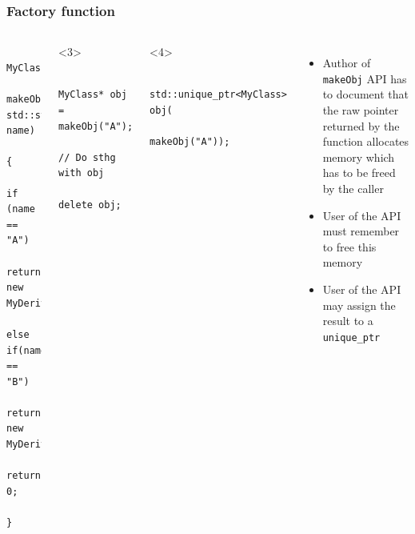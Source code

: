 \documentclass{beamer}
\begin{document}
\begin{frame}[fragile,t]
\frametitle{Factory function}
	\begin{columns}[t]
		\begin{lstlisting}
			MyClass* 
			makeObj(const std::string& name)
			{
				if (name == "A")
					return new MyDerivedClassA();
				else if(name == "B")
					return new MyDerivedClassB();
				return 0;			
			}
		\end{lstlisting}
		
        \hrulefill
		\begin{onlyenv}<3>
		\begin{lstlisting}
			MyClass* obj = makeObj("A");
			// Do sthg with obj
			delete obj;	
		\end{lstlisting}
		\end{onlyenv}
		\begin{onlyenv}<4>
		\begin{lstlisting}
			std::unique_ptr<MyClass> obj(
						makeObj("A"));	
		\end{lstlisting}
		\end{onlyenv}
		\begin{itemize}
			\item<2-> Author of \texttt{makeObj} API has to document that the raw pointer
				  returned by the function allocates memory which has to be
				  freed by the caller
			\item<3-> User of the API must remember to free this memory
			\item<4-> User of the API may assign the result to a \texttt{unique\_ptr}
		\end{itemize}
	\end{columns}
\end{frame}
\end{document}
